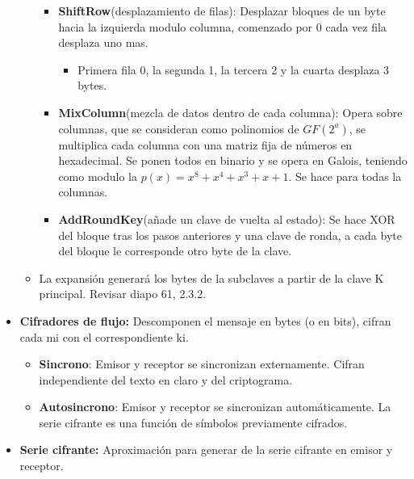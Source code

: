 \documentclass[12pt, twoside, openright]{report} %
\begin{document}
\begin{itemize}
\begin{itemize}
\begin{itemize}
\begin{itemize}
        \end{itemize}
      \item \textbf{ShiftRow}(desplazamiento de filas): Desplazar bloques de
        un byte hacia la izquierda modulo columna, comenzado por 0 cada
        vez fila desplaza uno mas.
        

        \begin{itemize}
        \item Primera fila 0, la segunda 1, la tercera 2 y la cuarta
          desplaza 3 bytes.
          
        \end{itemize}
      \item \textbf{MixColumn}(mezcla de datos dentro de cada columna):
        Opera sobre columnas, que se consideran como polinomios de
        $GF(2^a)$, se multiplica cada columna con una matriz fija de
        números en hexadecimal. Se ponen todos en binario y se opera en
        Galois, teniendo como modulo la $p(x)=x^8+x^4+x^3+x+1$. Se hace para
        todas la columnas.
        
      \item \textbf{AddRoundKey}(añade un clave de vuelta al estado): Se
        hace XOR del bloque tras los pasos anteriores y una clave de
        ronda, a cada byte del bloque le corresponde otro byte de la
        clave.
        
      \end{itemize}
    \item La expansión generará los bytes de la subclaves a partir de la
      clave K principal. Revisar diapo 61, 2.3.2.
      
    \end{itemize}
  \item \textbf{Cifradores de flujo:} Descomponen el mensaje en bytes (o en
    bits), cifran cada mi con el correspondiente ki.
    

    \begin{itemize}
    \item \textbf{Sincrono}: Emisor y receptor se sincronizan externamente.
      Cifran independiente del texto en claro y del criptograma.
      
    \item \textbf{Autosincrono}: Emisor y receptor se sincronizan
      automáticamente. La serie cifrante es una función de símbolos
      previamente cifrados.
      
    \end{itemize}
  \item \textbf{Serie cifrante:} Aproximación para generar de la serie
    cifrante en emisor y receptor.
    


\end{itemize}
\end{document}
